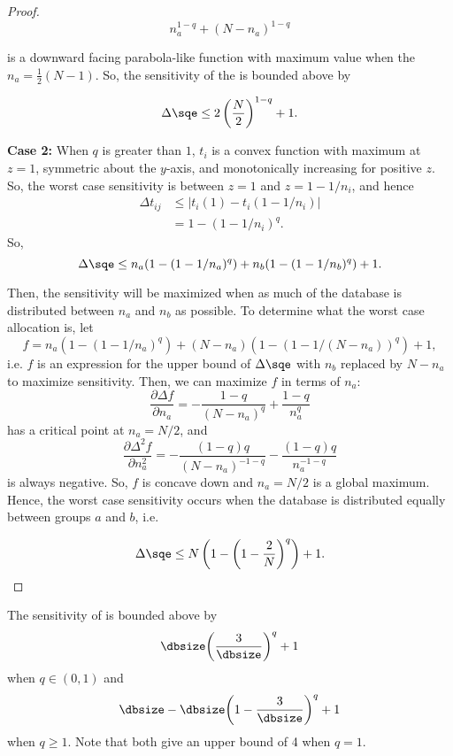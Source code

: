 \begin{proof}
$$n_a^{1-q} + (N-n_a)^{1-q}$$

\noindent is a downward facing parabola-like function with maximum value when the $n_a = \frac{1}{2}(N-1)$. So, the sensitivity of the \sqe is bounded above by

$$\Delta \sqe \le 2\left(\frac{N}{2}\right)^{1-q} + 1.$$

\noindent\textbf{Case 2:}
When $q$ is greater than $1$, $t_{i}$ is a convex function with maximum at $z=1$, symmetric about the $y$-axis, and monotonically increasing for positive $z$. So, the worst case sensitivity is between $z=1$ and $z=1-1/n_i$, and hence 
%
\begin{align*}
\Delta t_{ij} &\le \left\vert t_{i}(1) - t_{i}(1-1/n_i) \right\vert \\
	&= 1 - (1-1/n_i)^q.
\end{align*}
%
So, 
%
$$ \Delta\sqe \le n_a(1-(1-1/n_a)^q) + n_b(1-(1-1/n_b)^q) + 1.$$

Then, the sensitivity will be maximized when as much of the database is distributed between $n_a$ and $n_b$ as possible. To determine what the worst case allocation is, let 
$$f = n_a(1-(1-1/n_a)^q) + (N-n_a)(1-(1-1/(N-n_a))^q) + 1,$$
i.e. $f$ is an expression for the upper bound of $\Delta\sqe$ with $n_b$ replaced by $N-n_a$ to maximize sensitivity. Then, we can maximize $f$ in terms of $n_a$:
$$ \frac{\partial \Delta f}{\partial n_a} =  -\frac{1-q}{(N - n_a)^q} + \frac{1-q}{n_a^q}$$
has a critical point at $n_a = N/2$, and 
$$ \frac{\partial \Delta^2 f}{\partial n_a^2} = - \frac{(1-q)q}{(N-n_a)^{-1-q}} - \frac{(1-q)q}{n_a^{-1-q}}$$
is always negative. So, $f$ is concave down and $n_a = N/2$ is a global maximum. Hence, the worst case sensitivity occurs when the database is distributed equally between groups $a$ and $b$, i.e. 

$$ \Delta\sqe \le N \left( 1- \left(1-\frac{2}{N}\right)^q \right) + 1.$$
\end{proof}
\begin{theorem}\label{thm:SQAsens} The sensitivity of \sqa is bounded above by 
\begin{equation*}
\dbsize\bigg(\frac{3}{\dbsize}\bigg)^q + 1
\end{equation*}
when $q \in (0,1)$ and
\begin{equation*}
\dbsize-\dbsize\bigg(1-\frac{3}{\dbsize}\bigg)^q + 1
\end{equation*}
when $q \geq 1$. Note that both give an upper bound of 4 when $q = 1$.
\end{theorem}

